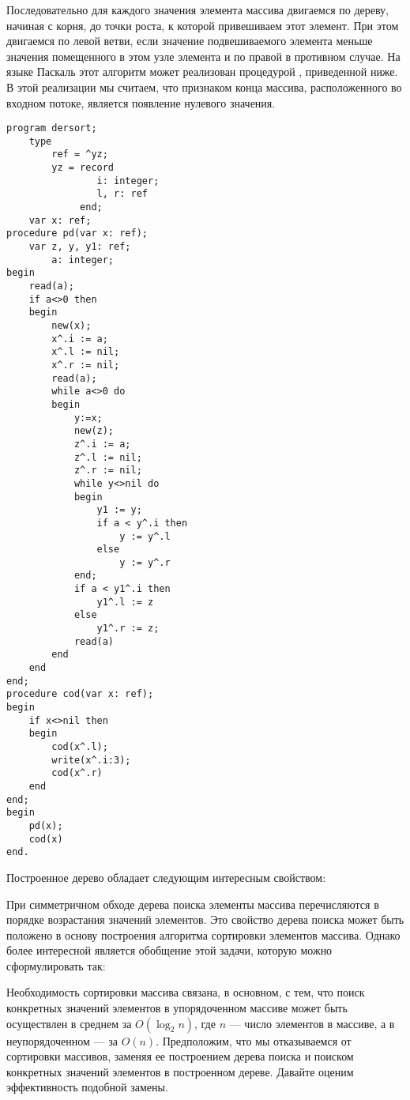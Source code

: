 \documentclass[12pt,a4paper]{article}
\theoremstyle{plain}
\theoremstyle{definition}
\theoremstyle{remark}
\begin{document}
Последовательно для каждого значения элемента массива двигаемся по дереву, начиная с корня, до точки роста, к которой привешиваем этот элемент. При этом двигаемся по левой ветви, если значение подвешиваемого элемента меньше значения помещенного в этом узле элемента и по правой в противном случае. На языке Паскаль этот алгоритм может реализован процедурой \verb@pd@, приведенной ниже. В этой реализации мы считаем, что признаком конца массива, расположенного во входном потоке, является появление нулевого значения.

\begin{verbatim}
program dersort;
    type
        ref = ^yz;
        yz = record
                i: integer;
                l, r: ref
             end;
    var x: ref;
procedure pd(var x: ref);
    var z, y, y1: ref;
        a: integer;
begin
    read(a);
    if a<>0 then
    begin
        new(x);
        x^.i := a;
        x^.l := nil;
        x^.r := nil;
        read(a);
        while a<>0 do
        begin
            y:=x;
            new(z);
            z^.i := a;
            z^.l := nil;
            z^.r := nil;
            while y<>nil do
            begin
                y1 := y;
                if a < y^.i then
                    y := y^.l
                else 
                    y := y^.r
            end;
            if a < y1^.i then
                y1^.l := z
            else
                y1^.r := z;
            read(a)
        end
    end
end;
procedure cod(var x: ref);
begin
    if x<>nil then
    begin
        cod(x^.l);
        write(x^.i:3);
        cod(x^.r)
    end
end;
begin
    pd(x);
    cod(x)
end.
\end{verbatim}

Построенное дерево обладает следующим интересным свойством: 

При симметричном обходе дерева поиска элементы массива перечисляются в порядке возрастания значений элементов. Это свойство дерева поиска может быть положено в основу построения алгоритма сортировки элементов массива. Однако более интересной является обобщение этой задачи, которую можно сформулировать так:

Необходимость сортировки массива связана, в основном, с тем, что поиск конкретных значений элементов в упорядоченном массиве может быть осуществлен в среднем за $O(\log_2 n)$, где $n$ --- число элементов в массиве, а в неупорядоченном --- за $O(n)$. Предположим, что мы отказываемся от сортировки массивов, заменяя ее построением дерева поиска и поиском конкретных значений элементов в построенном дереве. Давайте оценим эффективность подобной замены.
\end{document}
